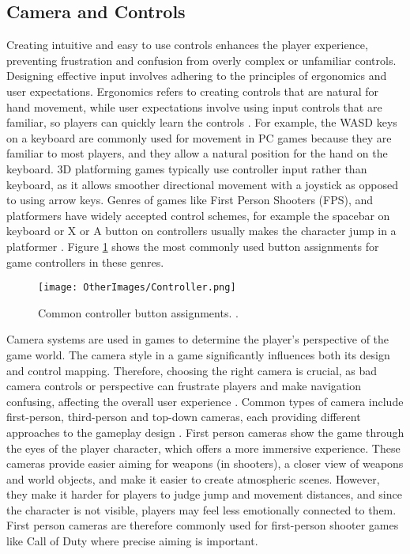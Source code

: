 \documentclass[10pt]{final_report}
\begin{document}
\subsection{Camera and Controls}
Creating intuitive and easy to use controls enhances the player experience, preventing frustration and confusion from overly complex or unfamiliar controls. Designing effective input involves adhering to the principles of ergonomics and user expectations. Ergonomics refers to creating controls that are natural for hand movement, while user expectations involve using input controls that are familiar, so players can quickly learn the controls \cite{Rogers2014}. For example, the WASD keys on a keyboard are commonly used for movement in PC games because they are familiar to most players, and they allow a natural position for the hand on the keyboard. 3D platforming games typically use controller input rather than keyboard, as it allows smoother directional movement with a joystick as opposed to using arrow keys. Genres of games like First Person Shooters (FPS), and platformers have widely accepted control schemes, for example the spacebar on keyboard or X or A button on controllers usually makes the character jump in a platformer \cite{Rogers2014}. Figure \ref{fig:Controller} shows the most commonly used button assignments for game controllers in these genres. \newline
\begin{figure}[H]
    \centering
    \texttt{[image: OtherImages/Controller.png]}
    \caption{Common controller button assignments. \cite{Rogers2014}.}
    \label{fig:Controller}
\end{figure}
Camera systems are used in games to determine the player's perspective of the game world. The camera style in a game significantly influences both its design and control mapping. Therefore, choosing the right camera is crucial, as bad camera controls or perspective can frustrate players and make navigation confusing, affecting the overall user experience \cite{Rogers2014}.
\newline
Common types of camera include first-person, third-person and top-down cameras, each providing different approaches to the gameplay design \cite{Kramarzewski2023}. First person cameras show the game through the eyes of the player character, which offers a more immersive experience. These cameras provide easier aiming for weapons (in shooters), a closer view of weapons and world objects, and make it easier to create atmospheric scenes. However, they make it harder for players to judge jump and movement distances, and since the character is not visible, players may feel less emotionally connected to them. First person cameras are therefore commonly used for first-person shooter games like Call of Duty where precise aiming is important.
\end{document}
